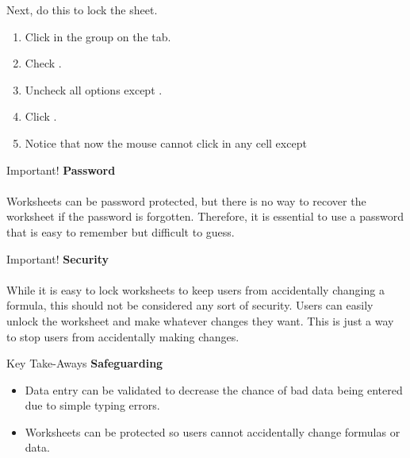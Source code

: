 Next, do this to lock the sheet.

\begin{enumerate}
	\item Click  in the  group on the  tab.
	\item Check .
	\item Uncheck all options except .
	\item Click .
	\item Notice that now the mouse cannot click in any cell except 
\end{enumerate}

\begin{center}
	\begin{infobox}{Important!}
		\textbf{Password}
		\\
		\\
		Worksheets can be password protected, but there is no way to recover the worksheet if the password is forgotten. Therefore, it is essential to use a password that is easy to remember but difficult to guess.
	\end{infobox}
\end{center}

\begin{center}
	\begin{infobox}{Important!}
		\textbf{Security}
		\\
		\\
		While it is easy to lock worksheets to keep users from accidentally changing a formula, this should not be considered any sort of security. Users can easily unlock the worksheet and make whatever changes they want. This is just a way to stop users from accidentally making changes.
	\end{infobox}
\end{center}

\begin{center}
	\begin{tkwbox}{Key Take-Aways}
		\textbf{Safeguarding}
		\\
		\begin{itemize}
			\setlength{\itemsep}{0pt}
			\setlength{\parskip}{0pt}
			\setlength{\parsep}{0pt}
			
			\item Data entry can be validated to decrease the chance of bad data being entered due to simple typing errors.
			\item Worksheets can be protected so users cannot accidentally change formulas or data.
			
		\end{itemize}
	\end{tkwbox}
\end{center}


